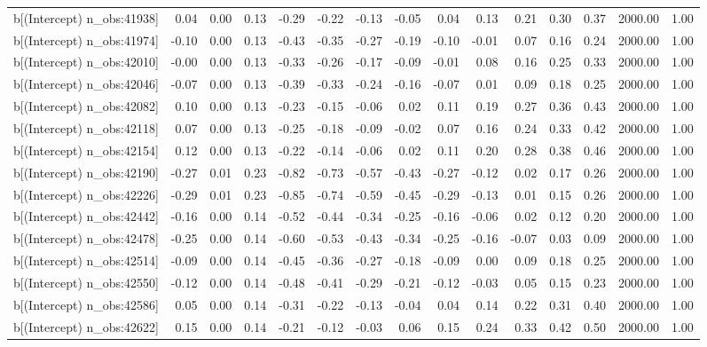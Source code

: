 \begin{table}[ht]
\begin{tabular}{rrrrrrrrrrrrrrr}
  b[(Intercept) n\_obs:41938] & 0.04 & 0.00 & 0.13 & -0.29 & -0.22 & -0.13 & -0.05 & 0.04 & 0.13 & 0.21 & 0.30 & 0.37 & 2000.00 & 1.00 \\ 
  b[(Intercept) n\_obs:41974] & -0.10 & 0.00 & 0.13 & -0.43 & -0.35 & -0.27 & -0.19 & -0.10 & -0.01 & 0.07 & 0.16 & 0.24 & 2000.00 & 1.00 \\ 
  b[(Intercept) n\_obs:42010] & -0.00 & 0.00 & 0.13 & -0.33 & -0.26 & -0.17 & -0.09 & -0.01 & 0.08 & 0.16 & 0.25 & 0.33 & 2000.00 & 1.00 \\ 
  b[(Intercept) n\_obs:42046] & -0.07 & 0.00 & 0.13 & -0.39 & -0.33 & -0.24 & -0.16 & -0.07 & 0.01 & 0.09 & 0.18 & 0.25 & 2000.00 & 1.00 \\ 
  b[(Intercept) n\_obs:42082] & 0.10 & 0.00 & 0.13 & -0.23 & -0.15 & -0.06 & 0.02 & 0.11 & 0.19 & 0.27 & 0.36 & 0.43 & 2000.00 & 1.00 \\ 
  b[(Intercept) n\_obs:42118] & 0.07 & 0.00 & 0.13 & -0.25 & -0.18 & -0.09 & -0.02 & 0.07 & 0.16 & 0.24 & 0.33 & 0.42 & 2000.00 & 1.00 \\ 
  b[(Intercept) n\_obs:42154] & 0.12 & 0.00 & 0.13 & -0.22 & -0.14 & -0.06 & 0.02 & 0.11 & 0.20 & 0.28 & 0.38 & 0.46 & 2000.00 & 1.00 \\ 
  b[(Intercept) n\_obs:42190] & -0.27 & 0.01 & 0.23 & -0.82 & -0.73 & -0.57 & -0.43 & -0.27 & -0.12 & 0.02 & 0.17 & 0.26 & 2000.00 & 1.00 \\ 
  b[(Intercept) n\_obs:42226] & -0.29 & 0.01 & 0.23 & -0.85 & -0.74 & -0.59 & -0.45 & -0.29 & -0.13 & 0.01 & 0.15 & 0.26 & 2000.00 & 1.00 \\ 
  b[(Intercept) n\_obs:42442] & -0.16 & 0.00 & 0.14 & -0.52 & -0.44 & -0.34 & -0.25 & -0.16 & -0.06 & 0.02 & 0.12 & 0.20 & 2000.00 & 1.00 \\ 
  b[(Intercept) n\_obs:42478] & -0.25 & 0.00 & 0.14 & -0.60 & -0.53 & -0.43 & -0.34 & -0.25 & -0.16 & -0.07 & 0.03 & 0.09 & 2000.00 & 1.00 \\ 
  b[(Intercept) n\_obs:42514] & -0.09 & 0.00 & 0.14 & -0.45 & -0.36 & -0.27 & -0.18 & -0.09 & 0.00 & 0.09 & 0.18 & 0.25 & 2000.00 & 1.00 \\ 
  b[(Intercept) n\_obs:42550] & -0.12 & 0.00 & 0.14 & -0.48 & -0.41 & -0.29 & -0.21 & -0.12 & -0.03 & 0.05 & 0.15 & 0.23 & 2000.00 & 1.00 \\ 
  b[(Intercept) n\_obs:42586] & 0.05 & 0.00 & 0.14 & -0.31 & -0.22 & -0.13 & -0.04 & 0.04 & 0.14 & 0.22 & 0.31 & 0.40 & 2000.00 & 1.00 \\ 
  b[(Intercept) n\_obs:42622] & 0.15 & 0.00 & 0.14 & -0.21 & -0.12 & -0.03 & 0.06 & 0.15 & 0.24 & 0.33 & 0.42 & 0.50 & 2000.00 & 1.00 \\ 

\end{tabular}
\end{table}
